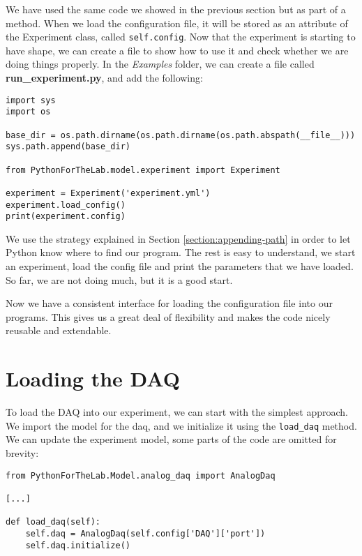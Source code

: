 We have used the same code we showed in the previous section but as part of a method. When we load the configuration file, it will be stored as an attribute of the Experiment class, called \texttt{self.config}. Now that the experiment is starting to have shape, we can create a file to show how to use it and check whether we are doing things properly. In the \emph{Examples} folder, we can create a file called \textbf{run\_experiment.py}, and add the following:

\begin{verbatim}
import sys
import os

base_dir = os.path.dirname(os.path.dirname(os.path.abspath(__file__)))
sys.path.append(base_dir)

from PythonForTheLab.model.experiment import Experiment

experiment = Experiment('experiment.yml')
experiment.load_config()
print(experiment.config)
\end{verbatim}

We use the strategy explained in Section \ref{section:appending-path} in order to let Python know where to find our program. The rest is easy to understand, we start an experiment, load the config file and print the parameters that we have loaded. So far, we are not doing much, but it is a good start.

Now we have a consistent interface for loading the configuration file into our programs. This gives us a great deal of flexibility and makes the code nicely reusable and extendable.


\section{Loading the DAQ}\label{section:loading-daq}
To load the DAQ into our experiment, we can start with the simplest approach. We import the model for the daq, and we initialize it using the \texttt{load\_daq} method. We can update the experiment model, some parts of the code are omitted for brevity:

\begin{verbatim}
from PythonForTheLab.Model.analog_daq import AnalogDaq

[...]

def load_daq(self):
    self.daq = AnalogDaq(self.config['DAQ']['port'])
    self.daq.initialize()
\end{verbatim}

